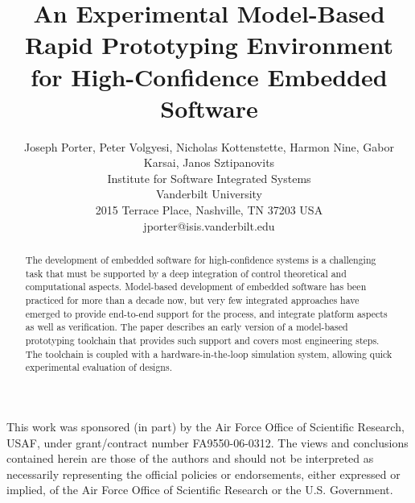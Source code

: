 \documentclass[10pt,twocolumn]{article}
\begin{document}
\title{An Experimental Model-Based Rapid Prototyping Environment for High-Confidence Embedded Software}
\author{Joseph Porter, Peter Volgyesi, Nicholas Kottenstette, Harmon Nine, Gabor Karsai, Janos Sztipanovits\\
Institute for Software Integrated Systems \\ Vanderbilt University\\ 2015 Terrace Place, Nashville, TN 37203 USA\\ jporter@isis.vanderbilt.edu\\
}
\maketitle
\thispagestyle{empty}
\begin{abstract}
   The development of embedded software for high-confidence systems is a challenging task that must be supported by a deep integration of control theoretical and computational aspects. Model-based development of embedded software has been practiced for more than a decade now, but very few integrated approaches have emerged to provide end-to-end support for the process, and integrate platform aspects as well as verification. The paper describes an early version of a model-based prototyping toolchain that provides such support and covers most engineering steps. The toolchain is coupled with a hardware-in-the-loop simulation system, allowing quick experimental evaluation of designs. 
\end{abstract}










This work was sponsored (in part) by the Air Force Office of Scientific Research, USAF, under grant/contract number FA9550-06-0312.  The views and conclusions contained herein are those of the authors and should not be interpreted as necessarily representing the official policies or endorsements, either expressed or implied, of the Air Force Office of Scientific Research or the U.S. Government.



\end{document}
